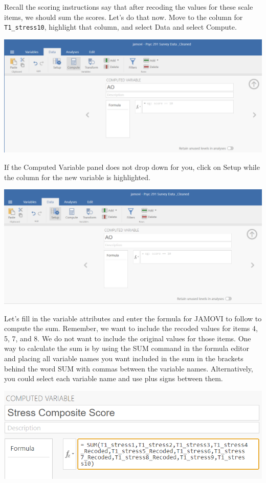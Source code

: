 \documentclass[
]{book}
\begin{document}
Recall the scoring instructions say that after recoding the values for these scale items, we should sum the scores. Let's do that now.
Move to the column for \texttt{T1\_stress10}, highlight that column, and select {Data} and select {Compute}.

\includegraphics{img/StressScale_ComputationCommands.png}

If the Computed Variable panel does not drop down for you, click on {Setup} while the column for the new variable is highlighted.

\includegraphics{img/StressScale_ComputationCommands_2.png}

Let's fill in the variable attributes and enter the formula for JAMOVI to follow to compute the sum. Remember, we want to include the recoded values for items 4, 5, 7, and 8. We do not want to include the original values for those items. One way to calculate the sum is by using the SUM command in the formula editor and placing all variable names you want included in the sum in the brackets behind the word SUM with commas between the variable names. Alternatively, you could select each variable name and use plus signs between them.

\includegraphics{img/StressScale_ComputationFormula1.png}
\end{document}
